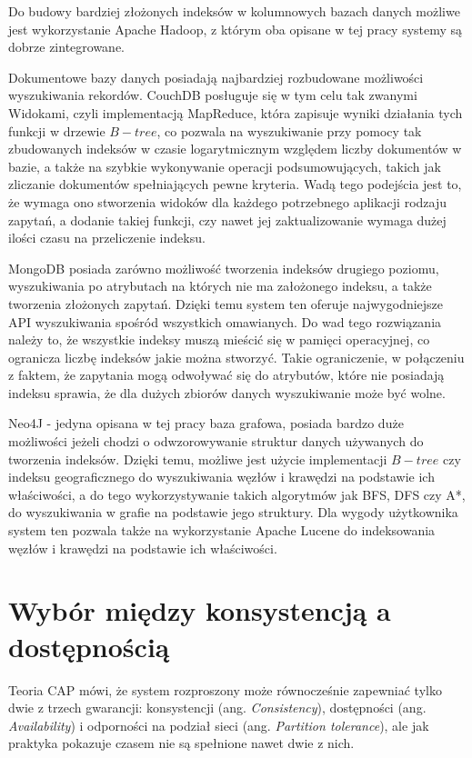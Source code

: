 Do budowy bardziej złożonych indeksów w kolumnowych bazach danych możliwe jest wykorzystanie Apache Hadoop, z którym oba opisane w tej pracy systemy są dobrze zintegrowane.

Dokumentowe bazy danych posiadają najbardziej rozbudowane możliwości wyszukiwania rekordów.
CouchDB posługuje się w tym celu tak zwanymi Widokami, czyli implementacją MapReduce, która zapisuje wyniki działania tych funkcji w drzewie $B-tree$, co pozwala na wyszukiwanie przy pomocy tak zbudowanych indeksów w czasie logarytmicznym względem liczby dokumentów w bazie, a także na szybkie wykonywanie operacji podsumowujących, takich jak zliczanie dokumentów spełniających pewne kryteria.
Wadą tego podejścia jest to, że wymaga ono stworzenia widoków dla każdego potrzebnego aplikacji rodzaju zapytań, a dodanie takiej funkcji, czy nawet jej zaktualizowanie wymaga dużej ilości czasu na przeliczenie indeksu.

MongoDB posiada zarówno możliwość tworzenia indeksów drugiego poziomu, wyszukiwania po atrybutach na których nie ma założonego indeksu, a także tworzenia złożonych zapytań.
Dzięki temu system ten oferuje najwygodniejsze API wyszukiwania spośród wszystkich omawianych.
Do wad tego rozwiązania należy to, że wszystkie indeksy muszą mieścić się w pamięci operacyjnej, co ogranicza liczbę indeksów jakie można stworzyć.
Takie ograniczenie, w połączeniu z faktem, że zapytania mogą odwoływać się do atrybutów, które nie posiadają indeksu sprawia, że dla dużych zbiorów danych wyszukiwanie może być wolne.

Neo4J - jedyna opisana w tej pracy baza grafowa, posiada bardzo duże możliwości jeżeli chodzi o odwzorowywanie struktur danych używanych do tworzenia indeksów.
Dzięki temu, możliwe jest użycie implementacji $B-tree$ czy indeksu geograficznego do wyszukiwania węzłów i krawędzi na podstawie ich właściwości, a do tego wykorzystywanie takich algorytmów jak BFS, DFS czy A*, do wyszukiwania w grafie na podstawie jego struktury.
Dla wygody użytkownika system ten pozwala także na wykorzystanie Apache Lucene do indeksowania węzłów i krawędzi na podstawie ich właściwości.

\section{Wybór między konsystencją a dostępnością}

Teoria CAP mówi, że system rozproszony może równocześnie zapewniać tylko dwie z trzech gwarancji: konsystencji (ang. \emph{Consistency}), dostępności (ang. \emph{Availability}) i odporności na podział sieci (ang. \emph{Partition tolerance}), ale jak praktyka pokazuje czasem nie są spełnione nawet dwie z nich.


